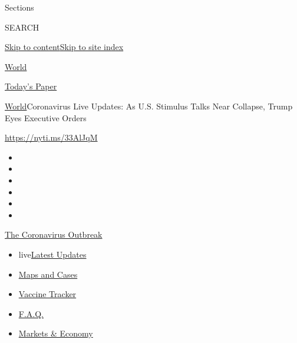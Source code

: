 Sections

SEARCH

\protect\hyperlink{site-content}{Skip to
content}\protect\hyperlink{site-index}{Skip to site index}

\href{https://www.nytimes3xbfgragh.onion/section/world}{World}

\href{https://myaccount.nytimes3xbfgragh.onion/auth/login?response_type=cookie\&client_id=vi}{}

\href{https://www.nytimes3xbfgragh.onion/section/todayspaper}{Today's
Paper}

\href{/section/world}{World}\textbar{}Coronavirus Live Updates: As U.S.
Stimulus Talks Near Collapse, Trump Eyes Executive Orders

\url{https://nyti.ms/33AlJqM}

\begin{itemize}
\item
\item
\item
\item
\item
\item
\end{itemize}

\href{https://www.nytimes3xbfgragh.onion/news-event/coronavirus?action=click\&pgtype=Article\&state=default\&region=TOP_BANNER\&context=storylines_menu}{The
Coronavirus Outbreak}

\begin{itemize}
\tightlist
\item
  live\href{https://www.nytimes3xbfgragh.onion/2020/08/07/world/covid-19-news.html?action=click\&pgtype=Article\&state=default\&region=TOP_BANNER\&context=storylines_menu}{Latest
  Updates}
\item
  \href{https://www.nytimes3xbfgragh.onion/interactive/2020/us/coronavirus-us-cases.html?action=click\&pgtype=Article\&state=default\&region=TOP_BANNER\&context=storylines_menu}{Maps
  and Cases}
\item
  \href{https://www.nytimes3xbfgragh.onion/interactive/2020/science/coronavirus-vaccine-tracker.html?action=click\&pgtype=Article\&state=default\&region=TOP_BANNER\&context=storylines_menu}{Vaccine
  Tracker}
\item
  \href{https://www.nytimes3xbfgragh.onion/interactive/2020/world/coronavirus-tips-advice.html?action=click\&pgtype=Article\&state=default\&region=TOP_BANNER\&context=storylines_menu}{F.A.Q.}
\item
  \href{https://www.nytimes3xbfgragh.onion/live/2020/08/07/business/stock-market-today-coronavirus?action=click\&pgtype=Article\&state=default\&region=TOP_BANNER\&context=storylines_menu}{Markets
  \& Economy}
\end{itemize}

